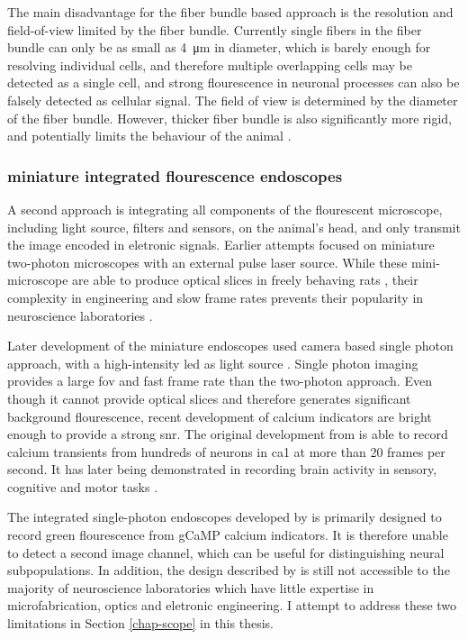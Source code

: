 The main disadvantage for the fiber bundle based approach is the resolution and field-of-view limited by the fiber bundle. Currently single fibers in the fiber bundle can only be as small as \SI{4}{\um} in diameter, which is barely enough for resolving individual cells, and therefore multiple overlapping cells may be detected as a single cell, and strong flourescence in neuronal processes can also be falsely detected as cellular signal. The field of view is determined by the diameter of the fiber bundle. However, thicker fiber bundle is also significantly more rigid, and potentially limits the behaviour of the animal \citep{yang17}. 


\subsubsection{miniature integrated flourescence endoscopes}
A second approach is integrating all components of the flourescent microscope, including light source, filters and sensors, on the animal's head, and only transmit the image encoded in eletronic signals. Earlier attempts focused on miniature two-photon microscopes with an external pulse laser source\citep{flusberg05, piyawattanametha09}. While these mini-microscope are able to produce optical slices in freely behaving rats \citep{sawinski09}, their complexity in engineering and slow frame rates prevents their popularity in neuroscience laboratories \citep{hamel15, yang17}.

Later development of the miniature endoscopes used camera based single photon approach, with a high-intensity \gls{led} as light source \citep{ghosh11}. Single photon imaging provides a large \gls{fov} and fast frame rate than the two-photon approach. Even though it cannot provide optical slices and therefore generates significant background flourescence, recent development of calcium indicators are bright enough to provide a strong \gls{snr}. The original development from \citet{ghosh11} is able to record calcium transients from hundreds of neurons in \gls{ca1} at more than 20 frames per second. It has later being demonstrated in recording brain activity in sensory, cognitive and motor tasks \citep{ziv13}.

The integrated single-photon endoscopes developed by \citet{ghosh11} is primarily designed to record green flourescence from gCaMP calcium indicators. It is therefore unable to detect a second image channel, which can be useful for distinguishing neural subpopulations. In addition, the design described by \citet{ghosh11} is still not accessible to the majority of neuroscience laboratories which have little expertise in microfabrication, optics and eletronic engineering. I attempt to address these two limitations in Section \ref{chap-scope} in this thesis. 

